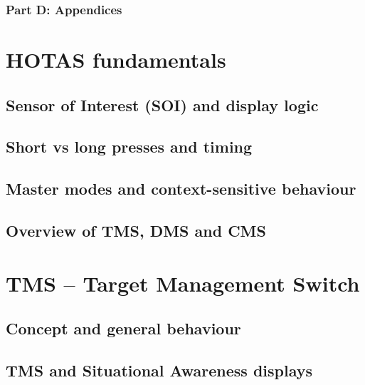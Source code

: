 \documentclass[11pt, a4paper, twoside]{report}
\begin{document}
\subsection{Part D: Appendices}
\label{sec:C1-S5-S4}

\chapter{HOTAS fundamentals}
\label{chap:C2}

\section{Sensor of Interest (SOI) and display logic}
\label{sec:C2-S1}

\section{Short vs long presses and timing}
\label{sec:C2-S2}

\section{Master modes and context-sensitive behaviour}
\label{sec:C2-S3}

\section{Overview of TMS, DMS and CMS}
\label{sec:C2-S4}

\chapter{TMS -- Target Management Switch}
\label{chap:C3}

\section{Concept and general behaviour}
\label{sec:C3-S1}

\section{TMS and Situational Awareness displays}
\label{sec:C3-S2}
\end{document}
